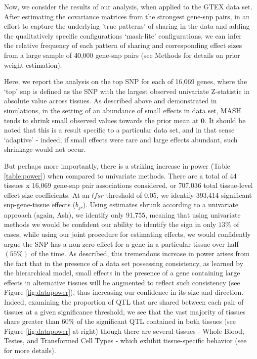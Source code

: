 Now, we consider the results of our analysis, when applied to the GTEX data set. After estimating the covariance matrices from the strongest gene-snp pairs, in an effort to capture the underlying 'true patterns' of sharing in the data and adding the qualitatively specific configurations `mash-lite' configurations, we can infer the relative frequency of each pattern of sharing and corresponding effect sizes from a large sample of 40,000 gene-snp pairs (see Methods for details on prior weight estimation).

Here, we report the analysis on the top SNP for each of 16,069 genes, where the `top' snp is defined as the SNP with the largest observed univariate Z-statistic in absolute value across tissues. As described above and demonstrated in simulations, in the setting of an abundance of small effects in data set, MASH tends to shrink small observed values towards the prior mean at $\bm{0}$. It should be noted that this is a result specific to a particular data set, and in that sense `adaptive' - indeed, if small effects were rare and large effects abundant, such shrinkage would not occur. 

But perhaps more importantly, there is a striking increase in power (Table \ref{table:power}) when compared to univariate methods. There are a total of 44 tissues x 16,069 gene-snp pair associations considered, or 707,036 total tissue-level effect size coefficients. At an $lfsr$ threshold of 0.05, we identify 393,414 significant snp-gene-tissue effects ($b_{jr}$). Using estimates shrunk according to a univariate approach (again, Ash),  we identify only 91,755, meaning that using univariate methods we would be confident our ability to identify the sign in only $13\%$ of cases, while using our joint procedure for estimating effects, we would confidently argue the SNP has a non-zero effect for a gene in a particular tissue over half $(55\%)$ of the time. As described, this tremendous increase in power arises from the fact that in the presence of  a data set possessing consistency, as learned by the hierarchical model, small effects in the presence of a gene containing large effects in alternative tissues will be augmented to reflect such consistency (see Figure \ref{fig:datapower}), thus increasing our confidence in its size and direction. Indeed, examining the proportion of QTL that are shared between each pair of tissues at a given significance threshold, we see that the vast majority of tissues share greater than $60\%$ of the significant QTL contained in both tissues (see Figure \ref{fig:datapower} at right) though there are several tissues - Whole Blood, Testes, and Transformed Cell Types - which exhibit tissue-specific behavior (see \label{ssec:tissuespec} for more details).

